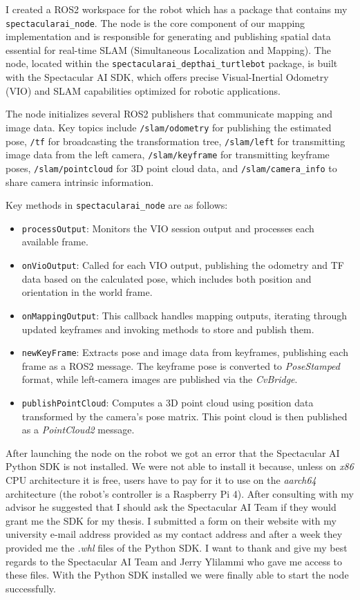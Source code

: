 I created a ROS2 workspace for the robot which has a package that contains my \verb|spectacularai_node|. The node is the core component of our mapping implementation and is responsible for generating and publishing spatial data essential for real-time SLAM (Simultaneous Localization and Mapping). The node, located within the \verb|spectacularai_depthai_turtlebot| package, is built with the Spectacular AI SDK, which offers precise Visual-Inertial Odometry (VIO) and SLAM capabilities optimized for robotic applications.

The node initializes several ROS2 publishers that communicate mapping and image data. Key topics include \verb|/slam/odometry| for publishing the estimated pose, \verb|/tf| for broadcasting the transformation tree, \verb|/slam/left| for transmitting image data from the left camera, \verb|/slam/keyframe| for transmitting keyframe poses, \verb|/slam/pointcloud| for 3D point cloud data, and \verb|/slam/camera_info| to share camera intrinsic information.

Key methods in \verb|spectacularai_node| are as follows:
\begin{itemize}
    \item \verb|processOutput|: Monitors the VIO session output and processes each available frame.
    \item \verb|onVioOutput|: Called for each VIO output, publishing the odometry and TF data based on the calculated pose, which includes both position and orientation in the world frame.
    \item \verb|onMappingOutput|: This callback handles mapping outputs, iterating through updated keyframes and invoking methods to store and publish them.
    \item \verb|newKeyFrame|: Extracts pose and image data from keyframes, publishing each frame as a ROS2 message. The keyframe pose is converted to \textit{PoseStamped} format, while left-camera images are published via the \textit{CvBridge}.
    \item \verb|publishPointCloud|: Computes a 3D point cloud using position data transformed by the camera’s pose matrix. This point cloud is then published as a \textit{PointCloud2} message.
\end{itemize}

After launching the node on the robot we got an error that the Spectacular AI Python SDK is not installed. We were not able to install it because, unless on \textit{x86} CPU architecture it is free, users have to pay for it to use on the \textit{aarch64} architecture (the robot's controller is a Raspberry Pi 4). After consulting with my advisor he suggested that I should ask the Spectacular AI Team if they would grant me the SDK for my thesis. I submitted a form on their website with my university e-mail address provided as my contact address and after a week they provided me the \textit{.whl} files of the Python SDK. I want to thank and give my best regards to the Spectacular AI Team and Jerry Ylilammi who gave me access to these files. With the Python SDK installed we were finally able to start the node successfully.

